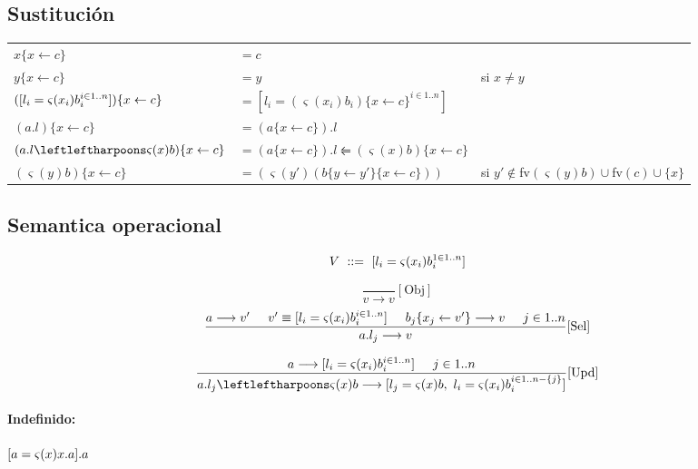 \documentclass[10pt,a4paper]{article}
\begin{document}
\subsection{Sustitución}
\begin{center}
\begin{tabular}{lll}
	$x\{x \leftarrow c\}$ &$= c$ & \\
	$y\{x \leftarrow c\}$ &$= y$ & si $x\neq y$\\
	$([l_i = \varsigma(x_i)b_i^{i\in 1..n}])\{x \leftarrow c\}$ &$=  [l_i = (\varsigma(x_i)b_i)\{x \leftarrow c\}^{i\in 1..n}]$ & \\
	$(a.l)\{x \leftarrow c\}$ &$= (a\{x \leftarrow c\}).l $ & \\
	$(\OORedefinicion{a.l}{x}{b})\{x \leftarrow c\}$ &$= (a\{x \leftarrow c\}).l \leftleftharpoons (\varsigma(x)b)\{x \leftarrow c\} $ & \\
	$(\varsigma(y)b)\{x \leftarrow c\}$ &$= (\varsigma(y')(b\{y \leftarrow y'\}\{x \leftarrow c\})) $ & si $y'\notin$fv$(\varsigma(y)b)\cup$fv$(c)\cup\{x\}$ \\
\end{tabular}
\end{center}

\subsection{Semantica operacional}
$$V~::=~[l_i = \varsigma(x_i)b_i^{1\in 1..n}]$$

$$\frac{}{v\longrightarrow v}[\text{Obj}]$$
\vspace*{5mm}
$$\frac{a\longrightarrow v'\hspace*{5mm} v'\equiv [l_i = \varsigma(x_i)b_i^{i\in 1..n}]\hspace*{5mm} b_j\{x_j\leftarrow v'\}\longrightarrow v\hspace*{5mm} j\in1..n}{a.l_j\longrightarrow v}[\text{Sel}]$$

\vspace*{5mm}
$$\frac{a\longrightarrow [\OOAtributo{l_i}{x_i}{b_i}^{i\in 1..n}]\hspace*{5mm} j\in1..n}{\OORedefinicion{a.l_j}{x}{b}\longrightarrow [\OOAtributo{l_j}{x}{b},~\OOAtributo{l_i}{x_i}{b_i}^{i\in 1..n-\{j\}}]}[\text{Upd}]$$

\paragraph{Indefinido: } $[a = \varsigma(x)x.a].a$
\end{document}
